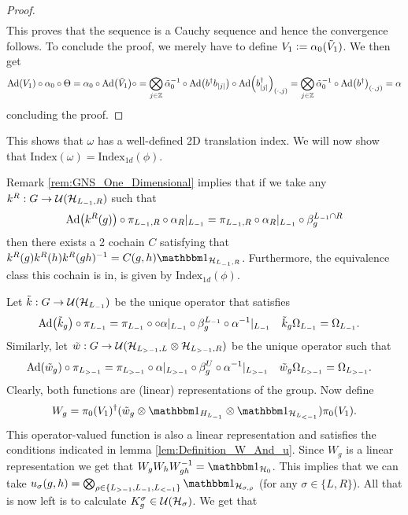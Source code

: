 \documentclass[11pt,a4paper,twoside]{article}
\numberwithin{equation}{section}
\begin{document}
\begin{proof}
\begin{align}
		\end{align}
		This proves that the sequence is a Cauchy sequence and hence the convergence follows. To conclude the proof, we merely have to define $V_1\vcentcolon= \alpha_0(\tilde{V}_1)$. We then get
		\begin{equation}
			\Ad{V_1}\circ \alpha_0\circ \Theta= \alpha_0\circ\Ad{\tilde V_1}\circ=\bigotimes_{j\in\ZZ}\tilde\alpha_0^{-1}\circ\Ad{b^\dagger b_\abs{j}}\circ \Ad{b_\abs{j}^\dagger}_{(\cdot,j)}=\bigotimes_{j\in\ZZ}\tilde\alpha_0^{-1}\circ\Ad{b^\dagger}_{(\cdot,j)}=\alpha
		\end{equation}
		concluding the proof.
	\end{proof}
	This shows that $\omega$ has a well-defined 2D translation index. We will now show that $\textrm{Index}(\omega)=\textrm{Index}_{1d}(\phi)$.
	\begin{remark}
		Remark \ref{rem:GNS_One_Dimensional} implies that if we take any $k^R:G\rightarrow \mathcal U(\mathcal H_{L_{-1},R})$ such that
		\begin{equation}
			\Ad{k^R(g)}\circ\pi_{L_{-1},R}\circ\alpha_R|_{L_{-1}}=\pi_{L_{-1},R}\circ\alpha_R|_{L_{-1}}\circ\beta_{g}^{L_{-1}\cap R}
		\end{equation}
		then there exists a 2 cochain $C$ satisfying that $k^R(g)k^R(h)k^R(gh)^{-1}=C(g,h)\id_{\HH_{L_{-1},R}}$. Furthermore, the equivalence class this cochain is in, is given by $\textrm{Index}_{1d}(\phi)$.
	\end{remark}
	Let $\tilde k:G\rightarrow \mathcal U(\mathcal H_{L_{-1}})$ be the unique operator that satisfies
	\begin{align}
		\Ad{\tilde{k}_g}\circ\pi_{L_{-1}}&=\pi_{L_{-1}}\circ \circ\alpha|_{L_{-1}}\circ\beta_g^{L_{-1}}\circ \alpha^{-1}|_{L_{-1}}&\tilde k_g\Omega_{L_{-1}}&=\Omega_{L_{-1}}.
	\end{align}
	Similarly, let $\tilde{w}:G\rightarrow\mathcal U(\mathcal H_{L_{>-1},L}\otimes\mathcal H_{L_{>-1},R})$ be the unique operator such that
	\begin{align}
		\Ad{\tilde w_{g}}\circ\pi_{L_{>-1}}&=\pi_{L_{>-1}}\circ\alpha|_{L_{>-1}}\circ\beta_g^{U}\circ \alpha^{-1}|_{L_{>-1}}&\tilde w_{g}\Omega_{L_{>-1}}&=\Omega_{L_{>-1}}.
	\end{align}
	Clearly, both functions are (linear) representations of the group. Now define
	\begin{equation}\label{eq:ChoiceOfW_g_ExampleH2Index}
		W_g=\pi_{0}(V_1)^{\dagger}(\tilde{w}_g\otimes\id_{H_{L_{-1}}}\otimes\id_{\HH_{L_{<-1}}}) \pi_{0}(V_1).
	\end{equation}
	This operator-valued function is also a linear representation and satisfies the conditions indicated in lemma \ref{lem:Definition_W_And_u}. Since $W_g$ is a linear representation we get that $W_gW_hW_{gh}^{-1}=\id_{\HH_0}$. This implies that we can take $u_\sigma(g,h)=\bigotimes_{\rho\in\{L_{>-1},L_{-1},L_{<-1}\}}\id_{\HH_{\sigma,\rho}}$ (for any $\sigma\in\{L,R\}$). All that is now left is to calculate $K^\sigma_g\in\mathcal U(\mathcal H_\sigma)$. We get that
\end{document}
